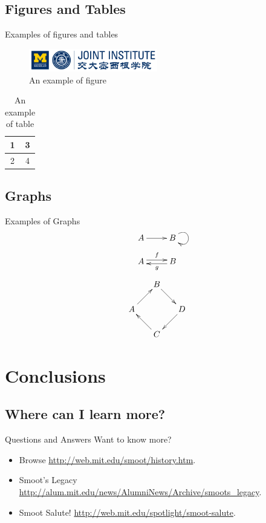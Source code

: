 \documentclass[12pt,compress]{beamer}
\begin{document}
\subsection{Figures and Tables}
\begin{frame}{Examples of figures and tables}
    \begin{figure}
        \centering
        \includegraphics[width=0.5\textwidth]{umji.png}
        \caption{An example of figure}
        \label{fig:demofig-1}
    \end{figure}
    \begin{table}[]
        \centering
        \begin{tabular}{c|c}
            1 & 3 \\ \hline
            2 & 4
        \end{tabular}
        \caption{An example of table}
        \label{tab:demotab-1}
    \end{table}
\end{frame}

\subsection{Graphs}
\begin{frame}{Examples of Graphs}
    \[ \xymatrix{
        A \ar[r] & B \ar@(ur,dr)
    } \]
    \[ \xymatrix{
        A \ar@<.5ex>[r]^{f} & \ar@<.5ex>[l]^{g} B
    } \]
    \[ \xymatrix@ru{
        A \ar[r] & B \ar[d] \\
        C \ar[u] & D \ar[l]
    } \]
    
\end{frame}


\section{Conclusions}

\subsection{Where can I learn more?}
\begin{frame}{Questions and Answers}
    Want to know more?
    \begin{itemize}
        \item Browse \url{http://web.mit.edu/smoot/history.htm}.
        \item Smoot's Legacy \url{http://alum.mit.edu/news/AlumniNews/Archive/smoots_legacy}.
        \item Smoot Salute! \url{http://web.mit.edu/spotlight/smoot-salute}.
    \end{itemize}
\end{frame}

\end{document}
